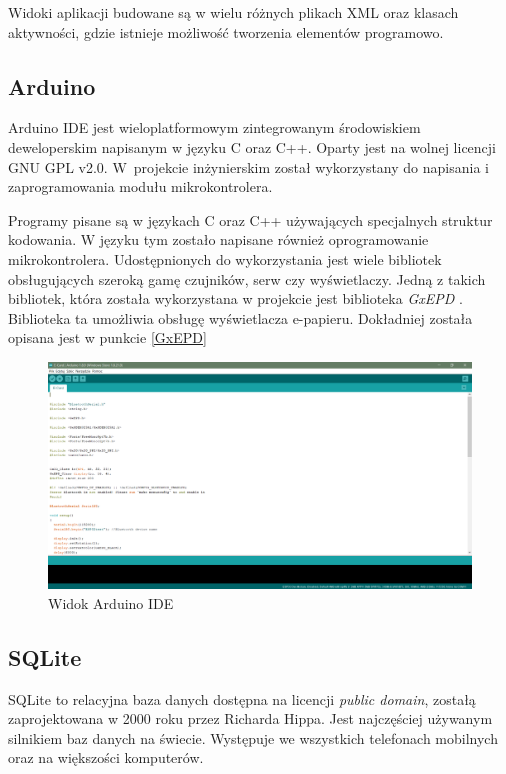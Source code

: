 \documentclass[a4paper,12pt, twoside]{article}
\begin{document}
    	Widoki aplikacji budowane są w wielu różnych plikach XML oraz klasach aktywności, gdzie istnieje możliwość tworzenia elementów programowo.
    	
    	\subsection{Arduino}
    	Arduino IDE jest wieloplatformowym zintegrowanym środowiskiem deweloperskim napisanym w języku C oraz C++. Oparty jest na wolnej licencji GNU GPL v2.0. W~projekcie inżynierskim został wykorzystany do napisania i zaprogramowania modułu mikrokontrolera.
    	
    	Programy pisane są w językach C oraz C++ używających specjalnych struktur kodowania. W języku tym zostało napisane również oprogramowanie mikrokontrolera. Udostępnionych do wykorzystania jest wiele bibliotek obsługujących szeroką gamę czujników, serw czy wyświetlaczy. Jedną z takich bibliotek, która została wykorzystana w projekcie jest biblioteka \textit{GxEPD} \cite{gxepd}. Biblioteka ta umożliwia obsługę wyświetlacza e-papieru. Dokładniej została opisana jest w punkcie \ref{GxEPD}
    	
    	\begin{figure}[H]
    			\includegraphics[width=1\textwidth]{images/rys3_arduino.png}
    			\caption{Widok Arduino IDE}
                \label{fig:arduinoide}
    	\end{figure}
    	
    	\subsection{SQLite}
    	SQLite to relacyjna baza danych dostępna na licencji \textit{public domain}\cite{publicdomain}, zostałą zaprojektowana w 2000 roku przez Richarda Hippa. Jest najczęściej używanym silnikiem baz danych na świecie. Występuje we wszystkich telefonach mobilnych oraz na większości komputerów. 
    	
\end{document}
